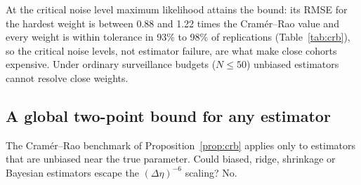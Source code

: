 \documentclass[12pt]{article}
\theoremstyle{definition}
\theoremstyle{remark}
\begin{document}
At the critical noise level maximum likelihood attains the bound: its RMSE for the hardest weight is between 0.88 and 1.22 times the Cram\'er--Rao value and every weight is within tolerance in 93\% to 98\% of replications (Table~\ref{tab:crb}), so the critical noise levels, not estimator failure, are what make close cohorts expensive. Under ordinary surveillance budgets ($N\le50$) unbiased estimators cannot resolve close weights.

\subsection{A global two-point bound for any estimator}

The Cram\'er--Rao benchmark of Proposition~\ref{prop:crb} applies only to estimators that are unbiased near the true parameter. Could biased, ridge, shrinkage or Bayesian estimators escape the $(\Delta\eta)^{-6}$ scaling? No.
\end{document}
